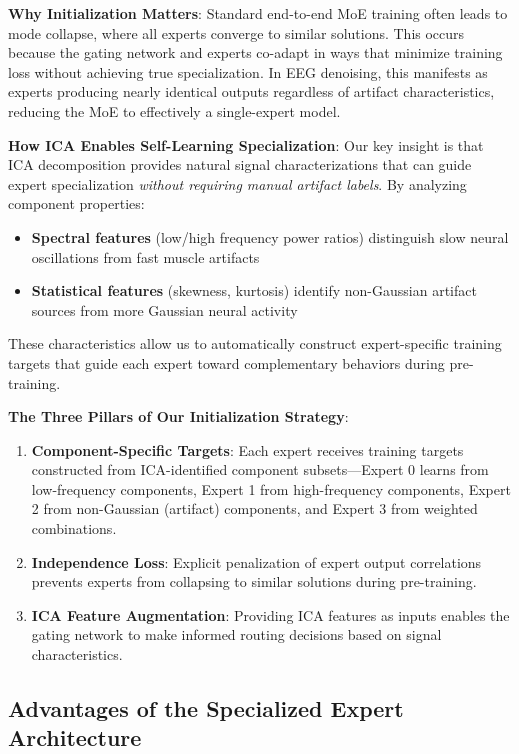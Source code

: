 \documentclass{article}
\begin{document}
\textbf{Why Initialization Matters}: Standard end-to-end MoE training often leads to mode collapse, where all experts converge to similar solutions. This occurs because the gating network and experts co-adapt in ways that minimize training loss without achieving true specialization. In EEG denoising, this manifests as experts producing nearly identical outputs regardless of artifact characteristics, reducing the MoE to effectively a single-expert model.

\textbf{How ICA Enables Self-Learning Specialization}: Our key insight is that ICA decomposition provides natural signal characterizations that can guide expert specialization \textit{without requiring manual artifact labels}. By analyzing component properties:
\begin{itemize}
\item \textbf{Spectral features} (low/high frequency power ratios) distinguish slow neural oscillations from fast muscle artifacts
\item \textbf{Statistical features} (skewness, kurtosis) identify non-Gaussian artifact sources from more Gaussian neural activity
\end{itemize}

These characteristics allow us to automatically construct expert-specific training targets that guide each expert toward complementary behaviors during pre-training.

\textbf{The Three Pillars of Our Initialization Strategy}:
\begin{enumerate}
\item \textbf{Component-Specific Targets}: Each expert receives training targets constructed from ICA-identified component subsets---Expert 0 learns from low-frequency components, Expert 1 from high-frequency components, Expert 2 from non-Gaussian (artifact) components, and Expert 3 from weighted combinations.
\item \textbf{Independence Loss}: Explicit penalization of expert output correlations prevents experts from collapsing to similar solutions during pre-training.
\item \textbf{ICA Feature Augmentation}: Providing ICA features as inputs enables the gating network to make informed routing decisions based on signal characteristics.
\end{enumerate}

\subsection{Advantages of the Specialized Expert Architecture}
\end{document}
